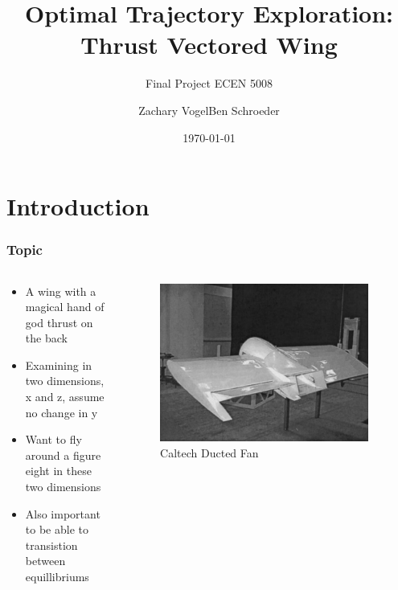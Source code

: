 \documentclass{beamer}
\title{Optimal Trajectory Exploration: Thrust Vectored Wing}
\subtitle{Final Project ECEN 5008}
\author{Zachary Vogel\quad Ben Schroeder}%
\date{\today}
\begin{document}
    
    \setcounter{showProgressBar}{0}
    \setcounter{showSlideNumbers}{0}
    
    
    \frame{\titlepage}
    
    \setcounter{framenumber}{0}
    \setcounter{showProgressBar}{1}
    \setcounter{showSlideNumbers}{1}
    
    \section{Introduction}
    \begin{frame}
        \frametitle{Topic}
        \begin{columns}[c]
            \begin{column}{0.6\textwidth}
                \begin{itemize}
                    \item A wing with a magical hand of god thrust on the back
                    \item Examining in two dimensions, x and z, assume no change in y
                    \item Want to fly around a figure eight in these two dimensions
                    \item Also important to be able to transistion between equillibriums
                \end{itemize}
            \end{column}
            \begin{column}{0.4\textwidth}
                \begin{figure}
                    \includegraphics[width=0.95\textwidth]{ducted_fan.png}
                    \caption*{Caltech Ducted Fan}
                \end{figure}
            \end{column}
        \end{columns}
    \end{frame}
    
\end{document}
